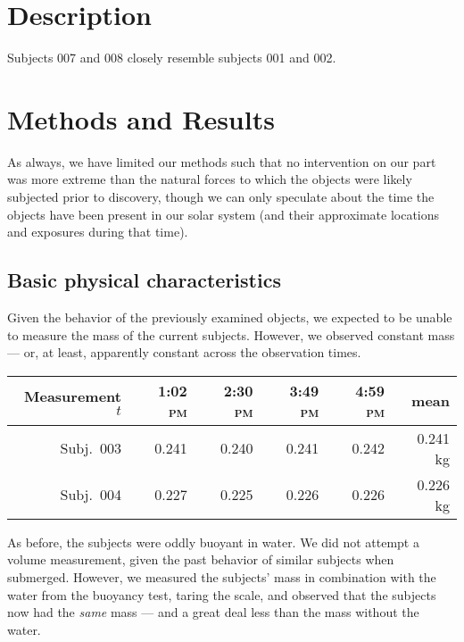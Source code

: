 \documentclass[10pt]{article}
\begin{document}
\maketitle


\section{Description}

Subjects 007 and 008 closely resemble subjects 001 and 002.


\section{Methods and Results}
As always, we have limited our methods such that no intervention on our part was more extreme than the natural forces to which the objects were likely subjected prior to discovery, though we can only speculate about the time the objects have been present in our solar system (and their approximate locations and exposures during that time).

\subsection{Basic physical characteristics}

Given the behavior of the previously examined objects, we expected to be unable to measure the mass of the current subjects.
However, we observed constant mass --- or, at least, apparently constant across the observation times.

\begin{tabular}[h]{r|rrrr|r}
Measurement $t$ & 1:02 \textsc{pm} & 2:30 \textsc{pm} & 3:49 \textsc{pm} & 4:59 \textsc{pm} & mean \\
\hline
Subj.~003 & 0.241 & 0.240 & 0.241 & 0.242 & 0.241 kg \\
Subj.~004 & 0.227 & 0.225 & 0.226 & 0.226 & 0.226 kg \\
\hline
\end{tabular}

As before, the subjects were oddly buoyant in water.
We did not attempt a volume measurement, given the past behavior of similar subjects when submerged.
However, we measured the subjects' mass in combination with the water from the buoyancy test, taring the scale, and observed that the subjects now had the \textit{same} mass --- and a great deal less than the mass without the water.
\end{document}
